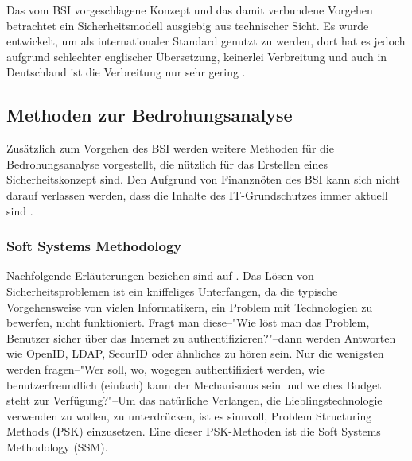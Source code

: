 \documentclass[11pt,a4paper]{report}
\begin{document}
Das vom BSI vorgeschlagene Konzept und das damit verbundene Vorgehen betrachtet ein Sicherheitsmodell ausgiebig aus technischer Sicht. Es wurde entwickelt, um als internationaler Standard genutzt zu werden, dort hat es jedoch aufgrund schlechter englischer Übersetzung, keinerlei Verbreitung und auch in Deutschland ist die Verbreitung nur sehr gering \cite{bsi_kritik}.


\subsection{Methoden zur Bedrohungsanalyse}

Zusätzlich zum Vorgehen des BSI werden weitere Methoden für die Bedrohungsanalyse vorgestellt, die nützlich für das Erstellen eines Sicherheitskonzept sind. Den Aufgrund von Finanznöten des BSI kann sich nicht darauf verlassen werden, dass die Inhalte des IT-Grund\-schutzes immer aktuell sind \cite{bsi_not}.

\subsubsection{Soft Systems Methodology} \label{sec:ssm}

Nachfolgende Erläuterungen beziehen sind auf \cite[s.~252]{gutmann}. 
Das Lösen von Sicherheitsproblemen ist ein kniffeliges Unterfangen, da die typische Vorgehensweise von vielen Informatikern, ein Problem mit Technologien zu bewerfen, nicht funktioniert. Fragt man diese--"Wie löst man das Problem, Benutzer sicher über das Internet zu authentifizieren?"--dann werden Antworten wie OpenID, LDAP, SecurID oder ähnliches zu hören sein. Nur die wenigsten werden fragen--"Wer soll, wo, wogegen authentifiziert werden, wie benutzerfreundlich (einfach) kann der Mechanismus sein und welches Budget steht zur Verfügung?"--Um das natürliche Verlangen, die Lieblingstechnologie verwenden zu wollen, zu unterdrücken, ist es sinnvoll, Problem Structuring Methods (PSK) einzusetzen. Eine dieser PSK-Methoden ist die Soft Systems Methodology (SSM).
\end{document}

